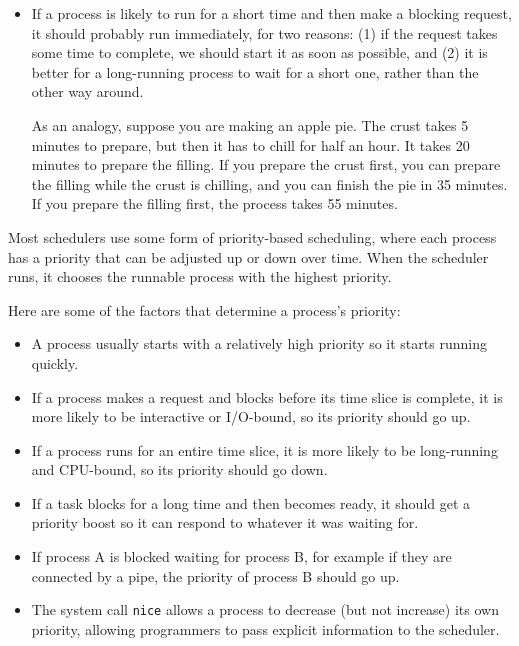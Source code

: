 \documentclass[12pt]{book}
\begin{document}
{\begin{itemize}
\item If a process is likely to run for a short time and then make
a blocking request, it should probably run immediately, for two reasons:
(1) if the request takes some time to complete, we should start it as soon
as possible, and (2) it is better for a long-running process to wait
for a short one, rather than the other way around.

As an analogy, suppose you are making an apple pie.  The crust takes
5 minutes to prepare, but then it has to chill for half an hour.  It takes
20 minutes to prepare the filling.  If you prepare the crust first,
you can prepare the filling while the crust is chilling, and you can
finish the pie in 35 minutes.  If you prepare the filling first, the
process takes 55 minutes.

\end{itemize}

Most schedulers use some form of priority-based scheduling,
where each process has a priority that can be adjusted up or down
over time.  When the scheduler runs, it chooses the runnable process
with the highest priority.

Here are some of the factors that determine a process's priority:

\begin{itemize}

\item A process usually starts with a relatively high priority so it
  starts running quickly.

\item If a process makes a request and blocks before its time slice is
  complete, it is more likely to be interactive or I/O-bound, so its
  priority should go up.

\item If a process runs for an entire time slice, it is more likely to
  be long-running and CPU-bound, so its priority should go down.

\item If a task blocks for a long time and then becomes ready, it
  should get a priority boost so it can respond to whatever it was
  waiting for.

\item If process A is blocked waiting for process B, for example if
  they are connected by a pipe, the priority of process B should go
  up.

\item The system call {\tt nice} allows a process to decrease (but not
  increase) its own priority, allowing programmers to pass explicit
  information to the scheduler.


\end{itemize}}
\end{document}
